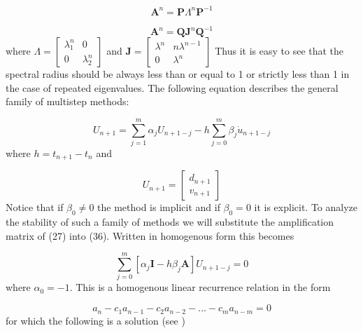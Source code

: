\documentclass{article}
\begin{document}
				\begin{equation*}
					\textbf{A}^n = \textbf{P}\textbf{$\Lambda$}^n\textbf{P}^{-1}
				\end{equation*}

				\begin{equation*}
					\textbf{A}^n = \textbf{Q}\textbf{J}^n\textbf{Q}^{-1}
				\end{equation*}
where $\textbf{$\Lambda$} = \begin{bmatrix}\lambda_1^n&0\\0&\lambda_2^n\end{bmatrix}$ and  $\textbf{J} = \begin{bmatrix}\lambda^n&n\lambda^{n-1}\\0&\lambda^n\end{bmatrix}$\newline \newline
Thus it is easy to see that the spectral radius should be always less than or equal to 1 or strictly less than 1 in the case of repeated eigenvalues. The following equation describes the general family of multistep methods:

				\begin{equation}
					U_{n+1} = \sum_{j=1}^{m} \alpha_jU_{n+1 - j} - h\sum_{j=0}^{m} \beta_j\dot{u}_{n+1 - j}
				\end{equation}
where $h = t_{n+1} - t_n$ and 

				\begin{equation*}
					U_{n+1} = \begin{bmatrix} d_{n+1} \\ v_{n+1}\end{bmatrix}
				\end{equation*}
Notice that if $\beta_0 \neq 0$ the method is implicit and  if $\beta_0 = 0$ it is explicit. 
To analyze the stability of such a family of methods we will substitute the amplification matrix of (27) into (36). Written in homogenous form this becomes

				\begin{equation}
	 				\sum_{j=0}^{m} \left[\alpha_j\textbf{I} - h\beta_j\textbf{A}\right]U_{n+1 - j} = 0
				\end{equation}
where $\alpha_0 = -1$. This is a homogenous linear recurrence relation in the form

				\begin{equation}
					a_n - c_1a_{n-1} - c_2a_{n-2} - \dots - c_ma_{n-m} = 0
				\end{equation}
for which the following is a solution (see \cite{LinRec})
\end{document}
